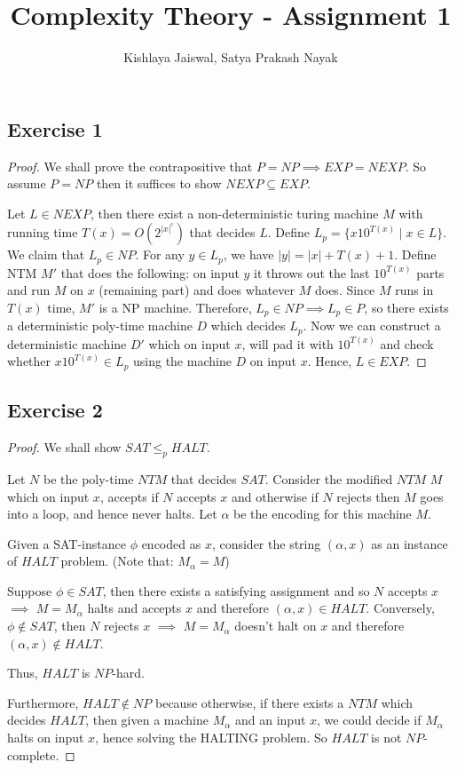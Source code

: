 \documentclass[12pt]{article}
\title{Complexity Theory - Assignment 1}
\author{Kishlaya Jaiswal, Satya Prakash Nayak}
\begin{document}
\maketitle

\vspace{0.5in}


\subsection*{Exercise 1}
\begin{proof}
We shall prove the contrapositive that $P = NP \implies EXP = NEXP$. So assume $P=NP$ then it suffices to show $NEXP \subseteq EXP$.

Let $L \in NEXP$, then there exist a non-deterministic turing machine $M$ with running time $T(x) = O(2^{|x|^c})$ that decides $L$.
Define $L_p = \{x10^{T(x)} \mid x \in L\}$.\\

We claim that $L_p \in NP$. For any $y \in L_p$, we have $|y| = |x| + T(x) + 1$. Define NTM $M'$ that does the following: on input $y$ it throws out the last $10^{T(x)}$ parts and run $M$ on $x$ (remaining part) and does whatever $M$ does. Since $M$ runs in $T(x)$ time, $M'$ is a NP machine. Therefore, $L_p \in NP \implies L_p \in P$, so there exists a deterministic poly-time machine $D$ which decides $L_p$. Now we can construct a deterministic machine $D'$ which on input $x$, will pad it with $10^{T(x)}$ and check whether $x10^{T(x)} \in L_p$ using the machine $D$ on input $x$. Hence, $L \in EXP$.
\end{proof}

\subsection*{Exercise 2}
\begin{proof}
We shall show $SAT \leq_p HALT$.

Let $N$ be the poly-time $NTM$ that decides $SAT$. Consider the modified $NTM$ $M$ which on input $x$, accepts if $N$ accepts $x$ and otherwise if $N$ rejects then $M$ goes into a loop, and hence never halts. Let $\alpha$ be the encoding for this machine $M$.

Given a SAT-instance $\phi$ encoded as $x$, consider the string $(\alpha, x)$ as an instance of $HALT$ problem. (Note that: $M_\alpha = M$)

Suppose $\phi \in SAT$, then there exists a satisfying assignment and so $N$ accepts $x$ $\implies$ $M = M_\alpha$ halts and accepts $x$ and therefore $(\alpha, x) \in HALT$. Conversely, $\phi \not \in SAT$, then $N$ rejects $x$ $\implies$ $M = M_\alpha$ doesn't halt on $x$ and therefore $(\alpha, x) \not \in HALT$.

Thus, $HALT$ is $NP$-hard.
\newline

Furthermore, $HALT \not \in NP$ because otherwise, if there exists a $NTM$ which decides $HALT$, then given a machine $M_\alpha$ and an input $x$, we could decide if $M_\alpha$ halts on input $x$, hence solving the HALTING problem. So $HALT$ is not $NP$-complete.
\end{proof}
\end{document}

